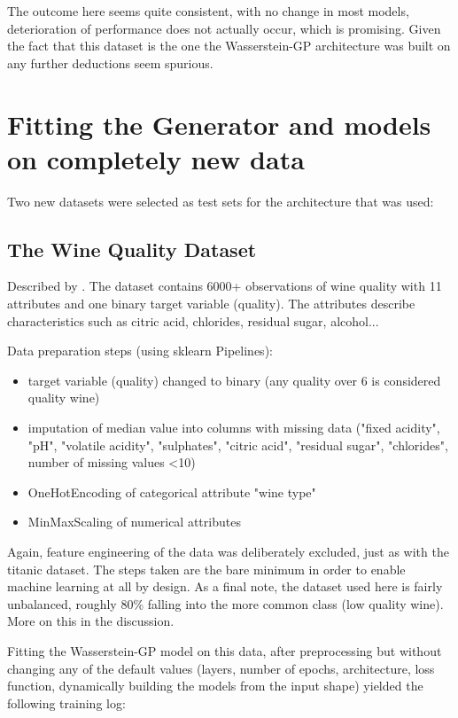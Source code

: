 \pagebreak

The outcome here seems quite consistent, with no change in most models, deterioration of performance does not actually occur, which is promising. 
Given the fact that this dataset is the one the Wasserstein-GP architecture was built on any further deductions seem spurious.

\clearpage

\section{Fitting the Generator and models on completely new data}

Two new datasets were selected as test sets for the architecture that was used:

\subsection{The Wine Quality Dataset}

Described by \cite{winequality}. The dataset contains 6000+ observations of wine quality with 11 attributes and one binary target variable (quality).
The attributes describe characteristics such as citric acid, chlorides, residual sugar, alcohol...

Data preparation steps (using sklearn Pipelines):
\begin{itemize}
	\item target variable (quality) changed to binary (any quality over 6 is considered quality wine)
	\item imputation of median value into columns with missing data ("fixed acidity", "pH", "volatile acidity", "sulphates", "citric acid", "residual sugar", "chlorides", number of missing values <10)
	\item OneHotEncoding of categorical attribute "wine type"
	\item MinMaxScaling of numerical attributes
\end{itemize}

Again, feature engineering of the data was deliberately excluded, just as with the titanic dataset. The steps taken are the bare minimum in order to enable machine learning at all by design.
As a final note, the dataset used here is fairly unbalanced, roughly 80\% falling into the more common class (low quality wine). More on this in the discussion.

Fitting the Wasserstein-GP model on this data, after preprocessing but without changing any of the default values (layers, number of epochs, architecture, loss function, dynamically building the models from the input shape) yielded the following training log:

